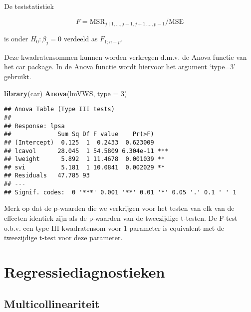 \documentclass[
  12pt,dutch,coursenotes]{book}
\newenvironment{Shaded}{\begin{snugshade}}{\end{snugshade}}
\newcommand{\DataTypeTok}[1]{\textcolor[rgb]{0.13,0.29,0.53}{#1}}
\newcommand{\DecValTok}[1]{\textcolor[rgb]{0.00,0.00,0.81}{#1}}
\newcommand{\KeywordTok}[1]{\textcolor[rgb]{0.13,0.29,0.53}{\textbf{#1}}}
\newcommand{\NormalTok}[1]{#1}
\theoremstyle{definition}
\theoremstyle{definition}
\theoremstyle{definition}
\theoremstyle{remark}
\begin{document}
De teststatistiek

\[
F=\text{MSR}_{j \mid 1,\ldots, j-1,j+1,\ldots, p-1}/\text{MSE}
\]

is onder \(H_0:\beta_j=0\) verdeeld as \(F_{1;n-p}\).

Deze kwadratensommen kunnen worden verkregen d.m.v. de Anova functie van het car package. In de Anova functie wordt hiervoor het argument `type=3' gebruikt.

\begin{Shaded}
\begin{Highlighting}[]
\KeywordTok{library}\NormalTok{(car)}
\KeywordTok{Anova}\NormalTok{(lmVWS, }\DataTypeTok{type =} \DecValTok{3}\NormalTok{)}
\end{Highlighting}
\end{Shaded}

\begin{verbatim}
## Anova Table (Type III tests)
## 
## Response: lpsa
##             Sum Sq Df F value    Pr(>F)    
## (Intercept)  0.125  1  0.2433  0.623009    
## lcavol      28.045  1 54.5809 6.304e-11 ***
## lweight      5.892  1 11.4678  0.001039 ** 
## svi          5.181  1 10.0841  0.002029 ** 
## Residuals   47.785 93                      
## ---
## Signif. codes:  0 '***' 0.001 '**' 0.01 '*' 0.05 '.' 0.1 ' ' 1
\end{verbatim}

Merk op dat de p-waarden die we verkrijgen voor het testen van elk van de effecten identiek zijn als de p-waarden van de tweezijdige t-testen.
De F-test o.b.v. een type III kwadratensom voor 1 parameter is equivalent met de tweezijdige t-test voor deze parameter.

\hypertarget{regressiediagnostieken}{%
\section{Regressiediagnostieken}\label{regressiediagnostieken}}

\hypertarget{multicollineariteit}{%
\subsection{Multicollineariteit}\label{multicollineariteit}}
\end{document}
